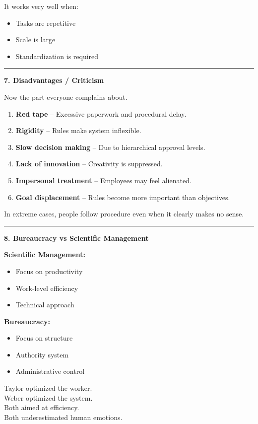 \documentclass[10pt,a4paper]{article}
\newcommand{\separator}{\vspace{0.4em}\noindent\rule{\linewidth}{0.6pt}\vspace{0.4em}}
\begin{document}
It works very well when:
\begin{itemize}
  \item Tasks are repetitive
  \item Scale is large
  \item Standardization is required
\end{itemize}

\separator

\textbf{7. Disadvantages / Criticism}

Now the part everyone complains about.

\begin{enumerate}
  \item \textbf{Red tape} -- Excessive paperwork and procedural delay.
  \item \textbf{Rigidity} -- Rules make system inflexible.
  \item \textbf{Slow decision making} -- Due to hierarchical approval levels.
  \item \textbf{Lack of innovation} -- Creativity is suppressed.
  \item \textbf{Impersonal treatment} -- Employees may feel alienated.
  \item \textbf{Goal displacement} -- Rules become more important than objectives.
\end{enumerate}

In extreme cases, people follow procedure even when it clearly makes no sense.

\separator

\textbf{8. Bureaucracy vs Scientific Management}

\textbf{Scientific Management:}
\begin{itemize}
  \item Focus on productivity
  \item Work-level efficiency
  \item Technical approach
\end{itemize}

\textbf{Bureaucracy:}
\begin{itemize}
  \item Focus on structure
  \item Authority system
  \item Administrative control
\end{itemize}

Taylor optimized the worker.\\
Weber optimized the system.\\
Both aimed at efficiency.\\
Both underestimated human emotions.
\end{document}
